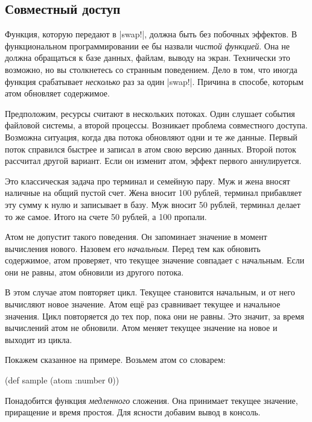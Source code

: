 \subsection{Совместный доступ}

Функция, которую передают в \spverb|swap!|, должна быть без побочных эффектов. В
функциональном программировании ее бы назвали \emph{чистой функцией}. Она не
должна обращаться к базе данных, файлам, выводу на экран. Технически это
возможно, но вы столкнетесь со странным поведением. Дело в том, что иногда
функция срабатывает \emph{несколько} раз за один \spverb|swap!|. Причина в
способе, которым атом обновляет содержимое.

Предположим, ресурсы считают в нескольких потоках. Один слушает события файловой
системы, а второй процессы. Возникает проблема совместного доступа. Возможна
ситуация, когда два потока обновляют одни и те же данные. Первый поток справился
быстрее и записал в атом свою версию данных. Второй поток рассчитал другой
вариант. Если он изменит атом, эффект первого аннулируется.

Это классическая задача про терминал и семейную пару. Муж и жена вносят наличные
на общий пустой счет. Жена вносит 100 рублей, терминал прибавляет эту сумму к
нулю и записывает в базу. Муж вносит 50 рублей, терминал делает то же
самое. Итого на счете 50 рублей, а 100 пропали.

Атом не допустит такого поведения. Он запоминает значение в момент вычисления
нового. Назовем его \emph{начальным}. Перед тем как обновить содержимое, атом
проверяет, что текущее значение совпадает с начальным. Если они не равны, атом
обновили из другого потока.

В этом случае атом повторяет цикл. Текущее становится начальным, и от него
вычисляют новое значение. Атом ещ\"{е} раз сравнивает текущее и начальное
значения. Цикл повторяется до тех пор, пока они не равны. Это значит, за время
вычислений атом не обновили. Атом меняет текущее значение на новое и выходит из
цикла.

Покажем сказанное на примере. Возьмем атом со словарем:

\begin{english}
  \begin{clojure}
(def sample (atom {:number 0}))
  \end{clojure}
\end{english}

Понадобится функция \emph{медленного} сложения. Она принимает текущее значение,
приращение и время простоя. Для ясности добавим вывод в консоль.

